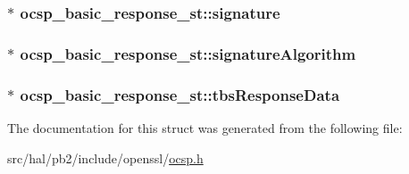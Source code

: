 \subsubsection[{\texorpdfstring{signature}{signature}}]{$\ast$ ocsp\+\_\+basic\+\_\+response\+\_\+st\+::signature}\hypertarget{structocsp__basic__response__st_afce61e2065685eaea0d539e366fe3cee}{}\label{structocsp__basic__response__st_afce61e2065685eaea0d539e366fe3cee}
\subsubsection[{\texorpdfstring{signature\+Algorithm}{signatureAlgorithm}}]{$\ast$ ocsp\+\_\+basic\+\_\+response\+\_\+st\+::signature\+Algorithm}\hypertarget{structocsp__basic__response__st_aaf4560b99757f89823b63d97c5e5487b}{}\label{structocsp__basic__response__st_aaf4560b99757f89823b63d97c5e5487b}
\subsubsection[{\texorpdfstring{tbs\+Response\+Data}{tbsResponseData}}]{$\ast$ ocsp\+\_\+basic\+\_\+response\+\_\+st\+::tbs\+Response\+Data}\hypertarget{structocsp__basic__response__st_a09c6bafbf175745b5919a3e15055354c}{}\label{structocsp__basic__response__st_a09c6bafbf175745b5919a3e15055354c}


The documentation for this struct was generated from the following file\+:\begin{DoxyCompactItemize}
\item 
src/hal/pb2/include/openssl/\hyperlink{ocsp_8h}{ocsp.\+h}\end{DoxyCompactItemize}
